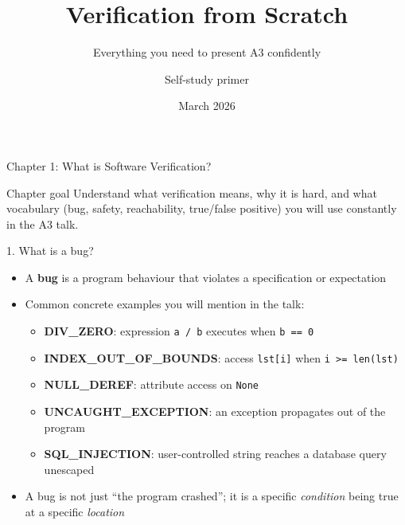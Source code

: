 \documentclass[aspectratio=169]{beamer}
\title{Verification from Scratch}
\subtitle{Everything you need to present A3 confidently}
\author{Self-study primer}
\date{March 2026}
\begin{document}
\begin{frame}
\titlepage
\end{frame}


\begin{frame}{Chapter 1: What is Software Verification?}
\tableofcontents[currentsection]
\begin{block}{Chapter goal}
Understand what verification means, why it is hard, and what vocabulary (bug, safety, reachability,
true/false positive) you will use constantly in the A3 talk.
\end{block}
\end{frame}

\begin{frame}{1. What is a bug?}
\begin{itemize}
  \item A \textbf{bug} is a program behaviour that violates a specification or expectation
  \item Common concrete examples you will mention in the talk:
  \begin{itemize}
    \item \textbf{DIV\_ZERO}: expression \texttt{a / b} executes when \texttt{b == 0}
    \item \textbf{INDEX\_OUT\_OF\_BOUNDS}: access \texttt{lst[i]} when \texttt{i >= len(lst)}
    \item \textbf{NULL\_DEREF}: attribute access on \texttt{None}
    \item \textbf{UNCAUGHT\_EXCEPTION}: an exception propagates out of the program
    \item \textbf{SQL\_INJECTION}: user-controlled string reaches a database query unescaped
  \end{itemize}
  \item A bug is not just ``the program crashed''; it is a specific \emph{condition} being true at a specific \emph{location}
\end{itemize}
\end{frame}
\end{document}
